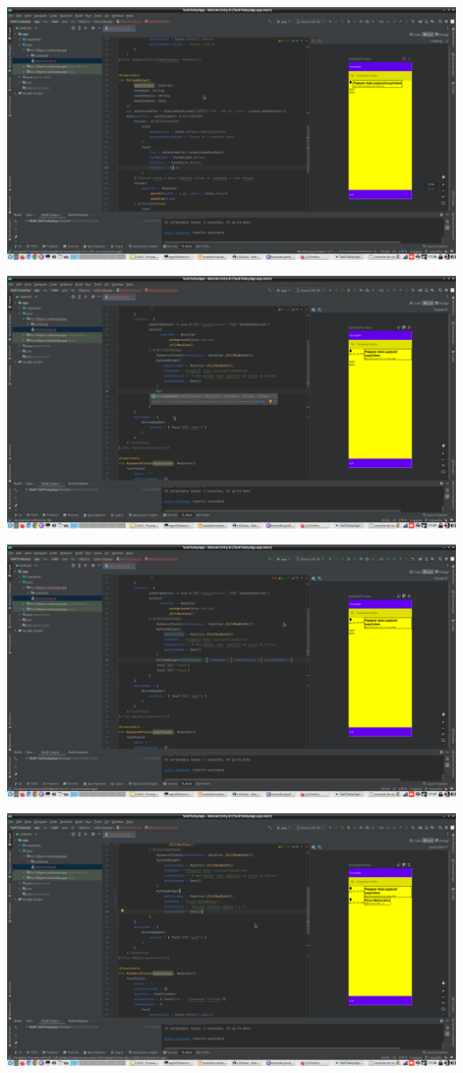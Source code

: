 \documentclass[11pt]{article}
\begin{document}
\begin{center}
\includegraphics[width=.9\linewidth]{./Captura de tela de 2023-03-29 17-36-30.png}
\end{center}
\begin{center}
\includegraphics[width=.9\linewidth]{./Captura de tela de 2023-03-29 17-37-06.png}
\end{center}
\begin{center}
\includegraphics[width=.9\linewidth]{./Captura de tela de 2023-03-29 17-37-18.png}
\end{center}
\begin{center}
\includegraphics[width=.9\linewidth]{./Captura de tela de 2023-03-29 17-39-14.png}
\end{center}
\end{document}
